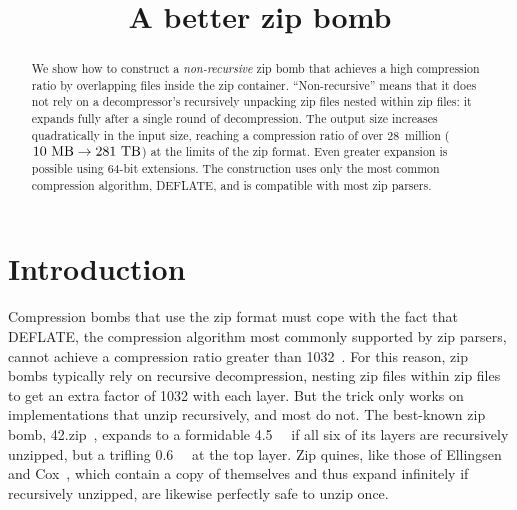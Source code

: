 \documentclass[letterpaper,twocolumn,10pt]{article}
\newcommand{\MB}{\mega\byte}
\newcommand{\TB}{\tera\byte}
\newcommand{\PB}{\peta\byte}
\begin{document}
\date{}

\title{\Large \bf A better zip bomb}

\author{
}

\maketitle

\begin{abstract}
We show how to construct a
\emph{non-recursive} zip bomb
that achieves a high compression ratio by
overlapping files inside the zip container.
``Non-recursive'' means that it does not rely on
a decompressor's recursively unpacking zip files nested within zip files:
it expands fully after a single round of decompression.
The output size increases quadratically in the input size,
reaching a compression ratio of over 28~million
($\SI{10}{\MB} \rightarrow \SI{281}{\TB}$)
at the limits of the zip format.
Even greater expansion is possible using
64-bit extensions.
The construction uses only the most common compression algorithm, DEFLATE,
and is compatible with most zip parsers.
\end{abstract}


\section{Introduction}
\label{sec:intro}

Compression bombs that use the zip format
must cope with the fact that DEFLATE,
the compression algorithm most commonly supported by zip parsers,
cannot achieve a compression ratio greater than
\num{1032}~\cite{zlib_tech}.
For this reason, zip bombs typically rely on recursive decompression,
nesting zip files within zip files to get an extra factor of 1032 with each layer.
But the trick only works on implementations that
unzip recursively, and most do not.
The best-known zip bomb, 42.zip~\cite{42.zip},
expands to a formidable \SI{4.5}{\PB}
if all six of its layers are recursively unzipped,
but a trifling \SI{0.6}{\MB} at the top layer.
Zip quines, like those of
Ellingsen~\cite{ellingsen}
and Cox~\cite{cox},
which contain a copy of themselves
and thus expand infinitely if recursively unzipped,
are likewise perfectly safe to unzip once.
\end{document}
